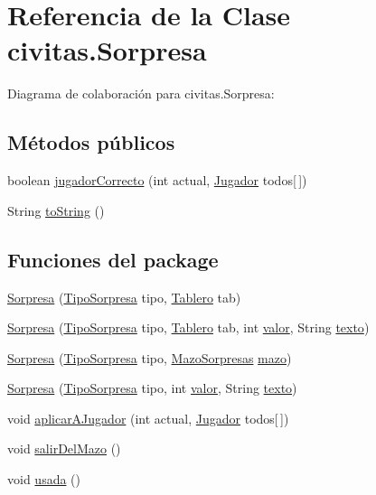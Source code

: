 \hypertarget{classcivitas_1_1Sorpresa}{}\section{Referencia de la Clase civitas.\+Sorpresa}
\label{classcivitas_1_1Sorpresa}


Diagrama de colaboración para civitas.\+Sorpresa\+:
\subsection*{Métodos públicos}
\begin{DoxyCompactItemize}
\item 
boolean \hyperlink{classcivitas_1_1Sorpresa_a640887e96c19efefffbd92b97f710381}{jugador\+Correcto} (int actual, \hyperlink{classcivitas_1_1Jugador}{Jugador} todos\mbox{[}$\,$\mbox{]})
\item 
String \hyperlink{classcivitas_1_1Sorpresa_ad2b9c7fd5bcc4ea986fac9ad8c9605e3}{to\+String} ()
\end{DoxyCompactItemize}
\subsection*{Funciones del \textquotesingle{}package\textquotesingle{}}
\begin{DoxyCompactItemize}
\item 
\hyperlink{classcivitas_1_1Sorpresa_a5789cc629379aedcc8577e748e966fdc}{Sorpresa} (\hyperlink{enumcivitas_1_1TipoSorpresa}{Tipo\+Sorpresa} tipo, \hyperlink{classcivitas_1_1Tablero}{Tablero} tab)
\item 
\hyperlink{classcivitas_1_1Sorpresa_adf70459739c97667854e3bc341d0e75d}{Sorpresa} (\hyperlink{enumcivitas_1_1TipoSorpresa}{Tipo\+Sorpresa} tipo, \hyperlink{classcivitas_1_1Tablero}{Tablero} tab, int \hyperlink{classcivitas_1_1Sorpresa_a7c1df71c9d226e14c75ec8ec66592485}{valor}, String \hyperlink{classcivitas_1_1Sorpresa_aa7f34d4a47ca2e53f96a060aed7b6c4f}{texto})
\item 
\hyperlink{classcivitas_1_1Sorpresa_a8476d67edfec1d155247a78ac79c30fa}{Sorpresa} (\hyperlink{enumcivitas_1_1TipoSorpresa}{Tipo\+Sorpresa} tipo, \hyperlink{classcivitas_1_1MazoSorpresas}{Mazo\+Sorpresas} \hyperlink{classcivitas_1_1Sorpresa_a3a0aae5184087ccd5a07391a2d5d0e78}{mazo})
\item 
\hyperlink{classcivitas_1_1Sorpresa_ac8329d952018aea614627c895669b262}{Sorpresa} (\hyperlink{enumcivitas_1_1TipoSorpresa}{Tipo\+Sorpresa} tipo, int \hyperlink{classcivitas_1_1Sorpresa_a7c1df71c9d226e14c75ec8ec66592485}{valor}, String \hyperlink{classcivitas_1_1Sorpresa_aa7f34d4a47ca2e53f96a060aed7b6c4f}{texto})
\item 
void \hyperlink{classcivitas_1_1Sorpresa_a368a76d34d0b1e3eb55519876ebcba44}{aplicar\+A\+Jugador} (int actual, \hyperlink{classcivitas_1_1Jugador}{Jugador} todos\mbox{[}$\,$\mbox{]})
\item 
void \hyperlink{classcivitas_1_1Sorpresa_a8b9ba892b6e916fde058e62d1a3c1b78}{salir\+Del\+Mazo} ()
\item 
void \hyperlink{classcivitas_1_1Sorpresa_a37c95138a99f3c67b8b93bf921e6baba}{usada} ()
\end{DoxyCompactItemize}
